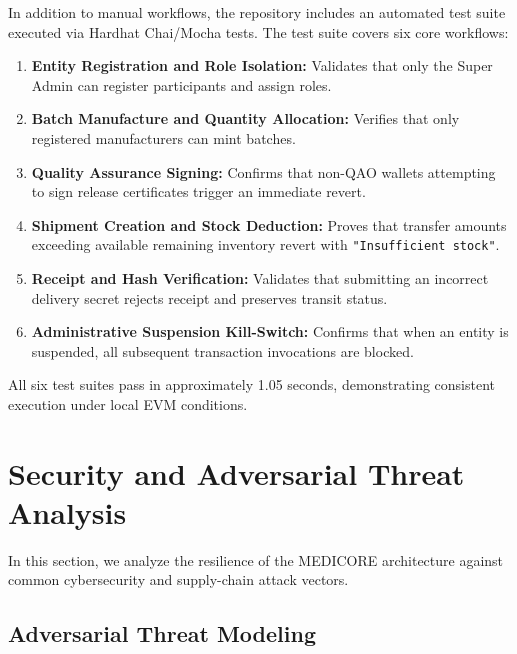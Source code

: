\documentclass[pdflatex,sn-mathphys-num]{sn-jnl}
\theoremstyle{thmstyleone}
\theoremstyle{thmstyletwo}
\theoremstyle{thmstylethree}
\begin{document}
In addition to manual workflows, the repository includes an automated test suite executed via Hardhat Chai/Mocha tests. The test suite covers six core workflows:
\begin{enumerate}
    \item \textbf{Entity Registration and Role Isolation:} Validates that only the Super Admin can register participants and assign roles.
    \item \textbf{Batch Manufacture and Quantity Allocation:} Verifies that only registered manufacturers can mint batches.
    \item \textbf{Quality Assurance Signing:} Confirms that non-QAO wallets attempting to sign release certificates trigger an immediate revert.
    \item \textbf{Shipment Creation and Stock Deduction:} Proves that transfer amounts exceeding available remaining inventory revert with \texttt{"Insufficient stock"}.
    \item \textbf{Receipt and Hash Verification:} Validates that submitting an incorrect delivery secret rejects receipt and preserves transit status.
    \item \textbf{Administrative Suspension Kill-Switch:} Confirms that when an entity is suspended, all subsequent transaction invocations are blocked.
\end{enumerate}
All six test suites pass in approximately 1.05 seconds, demonstrating consistent execution under local EVM conditions.


\section{Security and Adversarial Threat Analysis}\label{sec:security}

In this section, we analyze the resilience of the MEDICORE architecture against common cybersecurity and supply-chain attack vectors.

\subsection{Adversarial Threat Modeling}
\end{document}
